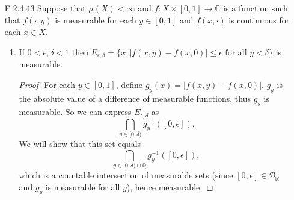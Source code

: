 \documentclass[10pt]{article}
\newcommand{\Q}{\mathbb{Q}}
\newcommand{\R}{\mathbb{R}}
\newcommand{\C}{\mathbb{C}}
\newcommand{\B}{\mathcal{B}}
\begin{document}
\begin{enumerate}
\begin{enumerate}
\begin{proof}
Since $|f_ng_n - fg| = |f_ng_n +f_ng - f_ng - fg| \leq |f_n||g_n-g| + |g||f_n-f|$, we know $|f_ng_n - fg| > \epsilon$ implies that $|f_n(x)||g_n(x)-g(x)| > \frac{\epsilon}{2}$ or $|g(x)||f_n(x)-f(x)| > \frac{\epsilon}{2}$.  Thus,

\begin{align*}
&\mu(\{x : |f_n(x)g_n(x) - f(x)g(x)| > \epsilon)
\\
\leq \ &\mu(\{x : |f_n(x)||g_n(x) - g(x)| > \frac{\epsilon}{2}\}) + \mu(\{x : |g(x)||f_n(x) - f(x)| > \frac{\epsilon}{2}\})
\\
< \ & \frac{\epsilon}{2} + \frac{\epsilon}{2} = \epsilon.
\end{align*}
So our chosen $N$ satisfies the definition.

To see that the requirement $\mu(X) < \infty$ is necessary, consider the sequences $f_n(x) = \frac{1}{n} \chi_{[0,n)}$ and $g_n(x) = \sum\limits_{k=1}^n k \cdot \chi_{[k-1,k)}$.  Then $f_n \rightarrow 0 = f$ in measure and $g_n \rightarrow \sum\limits_{k=1}^\infty k \cdot \chi_{[k-1,k)} = g$, which is finite for all $x$.  So $fg = 0$.  However, $f_ng_n = \sum\limits_{k=1}^n \frac{k}{n} \cdot \chi_{[k-1,k)}$ does not converge to $0$ in measure.  For all $n$, the set $\{x: |f_n(x)g_n(x) - 0| > \frac{1}{2}\}$ contains $[n-1,n)$, which has measure 1.
\end{proof}

\end{enumerate}

\item[F 2.4.43] Suppose that $\mu(X) < \infty$ and $f: X \times [0,1] \rightarrow \C$ is a function such that $f(\cdot , y)$ is measurable for each $y \in [0,1]$ and $f(x, \cdot)$ is continuous for each $x \in X$.
\begin{enumerate}
\item If $0 < \epsilon, \delta < 1$ then $E_{\epsilon, \delta} = \{x : |f(x,y) - f(x,0)| \leq \epsilon \text{ for all } y < \delta \}$ is measurable.

\begin{proof}

For each $y \in [0,1]$, define $g_y(x) = |f(x,y) - f(x,0)|$.  $g_y$ is the absolute value of a difference of measurable functions, thus $g_y$ is measurable.  So we can express $E_{\epsilon, \delta}$ as
$$
\bigcap_{y \in [0,\delta)} g_y^{-1}([0,\epsilon]).
$$
We will show that this set equals
$$
\bigcap_{y \in [0,\delta) \cap \Q} g_y^{-1}([0,\epsilon]),
$$
which is a countable intersection of measurable sets (since $[0,\epsilon] \in \B_\R$ and $g_y$ is measurable for all $y$), hence measurable.


\end{proof}
\end{enumerate}
\end{enumerate}
\end{document}

